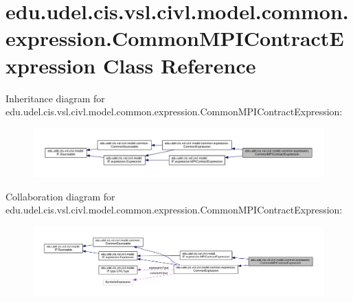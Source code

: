 \hypertarget{classedu_1_1udel_1_1cis_1_1vsl_1_1civl_1_1model_1_1common_1_1expression_1_1CommonMPIContractExpression}{}\section{edu.\+udel.\+cis.\+vsl.\+civl.\+model.\+common.\+expression.\+Common\+M\+P\+I\+Contract\+Expression Class Reference}
\label{classedu_1_1udel_1_1cis_1_1vsl_1_1civl_1_1model_1_1common_1_1expression_1_1CommonMPIContractExpression}


Inheritance diagram for edu.\+udel.\+cis.\+vsl.\+civl.\+model.\+common.\+expression.\+Common\+M\+P\+I\+Contract\+Expression\+:
\nopagebreak
\begin{figure}[H]
\begin{center}
\leavevmode
\includegraphics[width=350pt]{classedu_1_1udel_1_1cis_1_1vsl_1_1civl_1_1model_1_1common_1_1expression_1_1CommonMPIContractExpression__inherit__graph}
\end{center}
\end{figure}


Collaboration diagram for edu.\+udel.\+cis.\+vsl.\+civl.\+model.\+common.\+expression.\+Common\+M\+P\+I\+Contract\+Expression\+:
\nopagebreak
\begin{figure}[H]
\begin{center}
\leavevmode
\includegraphics[width=350pt]{classedu_1_1udel_1_1cis_1_1vsl_1_1civl_1_1model_1_1common_1_1expression_1_1CommonMPIContractExpression__coll__graph}
\end{center}
\end{figure}
